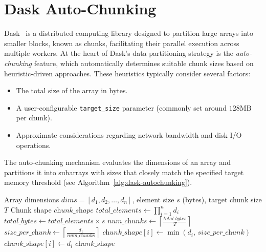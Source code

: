 \section{Dask Auto-Chunking}
\label{sec:idp-dask-auto-chunking}

Dask~\cite{rocklin2015dask} is a distributed computing library designed to partition large arrays into smaller blocks, known as chunks, facilitating their parallel execution across multiple workers.
At the heart of Dask's data partitioning strategy is the \emph{auto-chunking} feature, which automatically determines suitable chunk sizes based on heuristic-driven approaches.
These heuristics typically consider several factors:

\begin{itemize}
    \item The total size of the array in bytes.
    \item A user-configurable \texttt{target\_size} parameter (commonly set around $128\text{MB}$ per chunk).
    \item Approximate considerations regarding network bandwidth and disk \ac{I/O} operations.
\end{itemize}

The auto-chunking mechanism evaluates the dimensions of an array and partitions it into subarrays with sizes that closely match the specified target memory threshold (see Algorithm~\ref{alg:dask-autochunking}).

\begin{algorithm}[htbp]
    \caption{Dask auto‐chunking heuristic: computes the total size of the array in bytes, determines the number of chunks needed based on the target memory threshold, and partitions the first dimension accordingly while retaining full size for the other dimensions to form the chunk shape.}
    \label{alg:dask-autochunking}
    \begin{algorithmic}[1]
        \REQUIRE Array dimensions $\textit{dims} = [d_1, d_2, \dots, d_n]$, element size $s$ (bytes), target chunk size $T$
        \ENSURE Chunk shape $\textit{chunk\_shape}$
        \STATE $\textit{total\_elements} \gets \prod_{i=1}^{n} d_i$
        \STATE $\textit{total\_bytes} \gets \textit{total\_elements} \times s$
        \STATE $\textit{num\_chunks} \gets \left\lceil \frac{\textit{total\_bytes}}{T} \right\rceil$
        \STATE $\textit{size\_per\_chunk} \gets \left\lceil \frac{d_1}{\textit{num\_chunks}} \right\rceil$
        \STATE $\textit{chunk\_shape}[i] \gets \min(d_i,\, \textit{size\_per\_chunk})$
        \ELSE
        \STATE $\textit{chunk\_shape}[i] \gets d_i$
        \ENDIF
        \ENDFOR
        \RETURN $\textit{chunk\_shape}$
    \end{algorithmic}
\end{algorithm}

